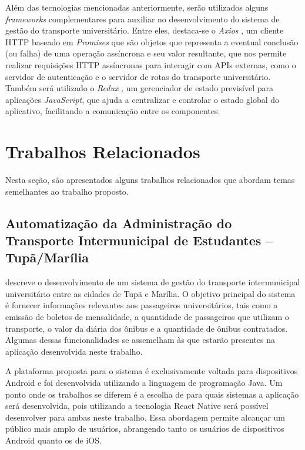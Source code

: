 \documentclass[
    12pt,                   %
    openright,              %
    oneside,                %
    a4paper,                %
    sumario=tradicional,    %
    english,                %
    brazil,                 %
    ]{abntex2}
\begin{document}
Além das tecnologias mencionadas anteriormente, serão utilizados alguns \textit{frameworks} complementares para auxiliar no desenvolvimento do sistema de gestão do transporte universitário. Entre eles, destaca-se o \textit{Axios} \cite{axios}, um cliente HTTP baseado em \textit{Promises} que são objetos que representa a eventual conclusão (ou falha) de uma operação assíncrona e seu valor resultante, que nos permite realizar requisições HTTP assíncronas para interagir com APIs externas, como o servidor de autenticação e o servidor de rotas do transporte universitário. Também será utilizado o \textit{Redux} \cite{redux}, um gerenciador de estado previsível para aplicações \textit{JavaScript}, que ajuda a centralizar e controlar o estado global do aplicativo, facilitando a comunicação entre os componentes.


\chapter{Trabalhos Relacionados}\label{sec:trabalhos-relacionado}

Nesta seção, são apresentados alguns trabalhos relacionados que abordam temas semelhantes ao trabalho proposto. 

\section{Automatização da Administração do Transporte Intermunicipal de Estudantes – Tupã/Marília}
\label{sec:TransporteIntermunicipalSouza2016}

\cite{Souza2016} descreve o desenvolvimento de um sistema de gestão do transporte intermunicipal universitário entre as cidades de Tupã e Marília. O objetivo principal do sistema é fornecer informações relevantes aos passageiros universitários, tais como a emissão de boletos de mensalidade, a quantidade de passageiros que utilizam o transporte, o valor da diária dos ônibus e a quantidade de ônibus contratados. Algumas dessas funcionalidades se assemelham às que estarão presentes na aplicação desenvolvida neste trabalho.

A plataforma proposta para o sistema é exclusivamente voltada para dispositivos Android e foi desenvolvida utilizando a linguagem de programação Java. Um ponto onde os trabalhos se diferem é a escolha de para quais sistemas a aplicação será desenvolvida, pois utilizando a tecnologia React Native será possível desenvolver para ambas neste trabalho. Essa abordagem permite alcançar um público mais amplo de usuários, abrangendo tanto os usuários de dispositivos Android quanto os de iOS.
\end{document}
